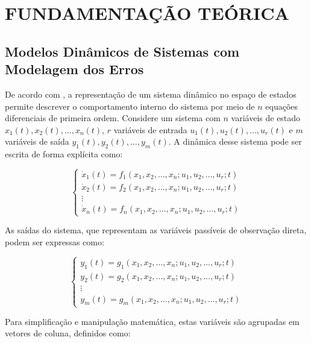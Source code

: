 \documentclass[a4paper,12pt]{article}
\begin{document}
\section{FUNDAMENTAÇÃO TEÓRICA}
\subsection{Modelos Dinâmicos de Sistemas com Modelagem dos Erros}
\label{subsec:ModelosDinamicos}
De acordo com , a representação de um sistema dinâmico no espaço de estados permite descrever o comportamento interno do sistema por meio de $n$ equações diferenciais de primeira ordem. Considere um sistema com $n$ variáveis de estado $x_1(t), x_2(t), \dots, x_n(t)$, $r$ variáveis de entrada $u_1(t), u_2(t), \dots, u_r(t)$ e $m$ variáveis de saída $y_1(t), y_2(t), \dots, y_m(t)$. A dinâmica desse sistema pode ser escrita de forma explícita como:

\begin{equation}
    \begin{cases}
        \dot{x}_1(t) = f_1(x_1, x_2, \dots, x_n; u_1, u_2, \dots, u_r; t) \\
        \dot{x}_2(t) = f_2(x_1, x_2, \dots, x_n; u_1, u_2, \dots, u_r; t) \\
        \vdots \\
        \dot{x}_n(t) = f_n(x_1, x_2, \dots, x_n; u_1, u_2, \dots, u_r; t)
    \end{cases}
    \label{eq:sistema_extenso_estados}
\end{equation}

As saídas do sistema, que representam as variáveis passíveis de observação direta, podem ser expressas como:

\begin{equation}
    \begin{cases}
        y_1(t) = g_1(x_1, x_2, \dots, x_n; u_1, u_2, \dots, u_r; t) \\
        y_2(t) = g_2(x_1, x_2, \dots, x_n; u_1, u_2, \dots, u_r; t) \\
        \vdots \\
        y_m(t) = g_m(x_1, x_2, \dots, x_n; u_1, u_2, \dots, u_r; t)
    \end{cases}
    \label{eq:sistema_extenso_saidas}
\end{equation}

Para simplificação e manipulação matemática, estas variáveis são agrupadas em vetores de coluna, definidos como:
\end{document}
